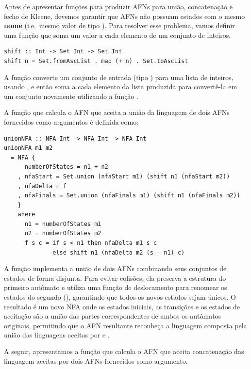 Antes de apresentar funções para produzir AFNs para união,
concatenação e fecho de Kleene, devemos garantir que AFNs não possuam
estados com o mesmo \textbf{nome} (i.e.~mesmo valor de tipo
). Para resolver esse problema, vamos
definir uma função que soma um valor  a
cada elemento de um conjunto de inteiros.

\begin{verbatim}
shift :: Int -> Set Int -> Set Int
shift n = Set.fromAscList . map (+ n) . Set.toAscList
\end{verbatim}

A função  converte um conjunto de
entrada (tipo ) para uma lista de
inteiros, usando , e então
soma  a cada elemento da lista produzida
para convertê-la em um conjunto novamente utilizando a função
.

A função que calcula o AFN que aceita a união da linguagem de dois
AFNs fornecidos como argumentos é definida como:

\begin{verbatim}
unionNFA :: NFA Int -> NFA Int -> NFA Int
unionNFA m1 m2
  = NFA {
      numberOfStates = n1 + n2
    , nfaStart = Set.union (nfaStart m1) (shift n1 (nfaStart m2))
    , nfaDelta = f
    , nfaFinals = Set.union (nfaFinals m1) (shift n1 (nfaFinals m2))
    }
    where
      n1 = numberOfStates m1
      n2 = numberOfStates m2
      f s c = if s < n1 then nfaDelta m1 s c
              else shift n1 (nfaDelta m2 (s - n1) c)
\end{verbatim}

A função  implementa a união de
dois AFNs combinando seus conjuntos de estados de forma disjunta.
Para evitar colisões, ela preserva a estrutura do primeiro autômato
 e utiliza uma função de deslocamento
 para renomear os estados do segundo
(), garantindo que todos os novos estados
sejam únicos. O resultado é um novo NFA onde os estados iniciais, as
transições e os estados de aceitação são a união das partes
correspondentes de ambos os autômatos originais, permitindo que o AFN
resultante reconheça a linguagem composta pela união das linguagens
aceitas por  e .

A seguir, apresentamos a função que calcula o AFN que aceita
concatenação das linguagem aceitas por dois AFNs fornecidos como argumento.

